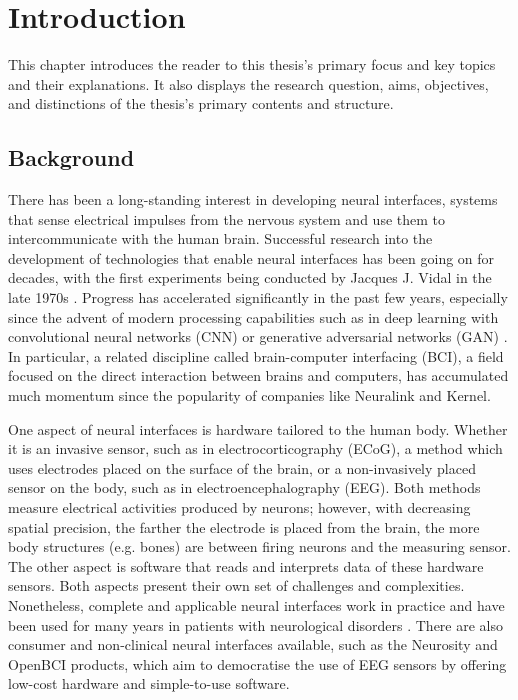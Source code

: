 \chapter{Introduction}
\graphicspath{{Chapter1/Figs/}{Chapter1/Figs/}}

This chapter introduces the reader to this thesis's primary focus and key topics and their explanations. It also displays the research question, aims, objectives, and distinctions of the thesis's primary contents and structure.

\section{Background}
\label{chapter1-background}

There has been a long-standing interest in developing neural interfaces, systems that sense electrical impulses from the nervous system and use them to intercommunicate with the human brain. Successful research into the development of technologies that enable neural interfaces has been going on for decades, with the first experiments being conducted by Jacques J. Vidal in the late 1970s \citep{vidal_real-time_1977}. Progress has accelerated significantly in the past few years, especially since the advent of modern processing capabilities such as in deep learning with convolutional neural networks (CNN) or generative adversarial networks (GAN) \citep{gonfalonieri_deep_2019}. In particular, a related discipline called brain-computer interfacing (BCI), a field focused on the direct interaction between brains and computers, has accumulated much momentum since the popularity of companies like Neuralink and Kernel.

One aspect of neural interfaces is hardware tailored to the human body. Whether it is an invasive sensor, such as in electrocorticography (ECoG), a method which uses electrodes placed on the surface of the brain, or a non-invasively placed sensor on the body, such as in electroencephalography (EEG). Both methods measure electrical activities produced by neurons; however, with decreasing spatial precision, the farther the electrode is placed from the brain, the more body structures (e.g. bones) are between firing neurons and the measuring sensor. The other aspect is software that reads and interprets data of these hardware sensors. Both aspects present their own set of challenges and complexities. Nonetheless, complete and applicable neural interfaces work in practice and have been used for many years in patients with neurological disorders \citep{braingate_publications_nodate}. There are also consumer and non-clinical neural interfaces available, such as the Neurosity and OpenBCI products, which aim to democratise the use of EEG sensors by offering low-cost hardware and simple-to-use software.

